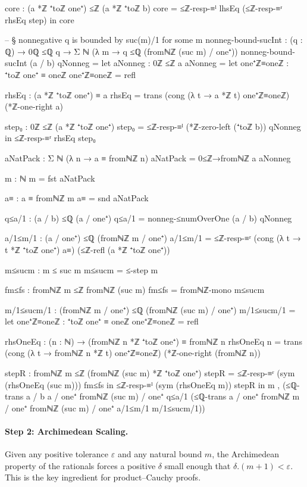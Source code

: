 \documentclass[11pt,a4paper]{book}
\def\cdot{.}%
\begin{document}
\begin{code}
    core : (a *ℤ ⁺toℤ one⁺) ≤ℤ (a *ℤ ⁺toℤ b)
    core = ≤ℤ-resp-≡ˡ lhsEq (≤ℤ-resp-≡ʳ rhsEq step)
  in
  core

-- § nonnegative q is bounded by suc(m)/1 for some m
nonneg-bound-sucInt : (q : ℚ) → 0ℚ ≤ℚ q → Σ ℕ (λ m → q ≤ℚ (fromℕℤ (suc m) / one⁺))
nonneg-bound-sucInt (a / b) qNonneg =
  let
    aNonneg : 0ℤ ≤ℤ a
    aNonneg =
      let
        one⁺ℤ≡oneℤ : ⁺toℤ one⁺ ≡ oneℤ
        one⁺ℤ≡oneℤ = refl

        rhsEq : (a *ℤ ⁺toℤ one⁺) ≡ a
        rhsEq = trans (cong (λ t → a *ℤ t) one⁺ℤ≡oneℤ) (*ℤ-one-right a)

        step₀ : 0ℤ ≤ℤ (a *ℤ ⁺toℤ one⁺)
        step₀ = ≤ℤ-resp-≡ˡ (*ℤ-zero-left (⁺toℤ b)) qNonneg
      in
      ≤ℤ-resp-≡ʳ rhsEq step₀

    aNatPack : Σ ℕ (λ n → a ≡ fromℕℤ n)
    aNatPack = 0≤ℤ→fromℕℤ a aNonneg

    m : ℕ
    m = fst aNatPack

    a≡ : a ≡ fromℕℤ m
    a≡ = snd aNatPack

    q≤a/1 : (a / b) ≤ℚ (a / one⁺)
    q≤a/1 = nonneg-≤numOverOne (a / b) qNonneg

    a/1≤m/1 : (a / one⁺) ≤ℚ (fromℕℤ m / one⁺)
    a/1≤m/1 =
      ≤ℤ-resp-≡ʳ
        (cong (λ t → t *ℤ ⁺toℤ one⁺) a≡)
        (≤ℤ-refl (a *ℤ ⁺toℤ one⁺))

    m≤sucm : m ≤ suc m
    m≤sucm = ≤-step m

    fm≤fs : fromℕℤ m ≤ℤ fromℕℤ (suc m)
    fm≤fs = fromℕℤ-mono m≤sucm

    m/1≤sucm/1 : (fromℕℤ m / one⁺) ≤ℚ (fromℕℤ (suc m) / one⁺)
    m/1≤sucm/1 =
      let
        one⁺ℤ≡oneℤ : ⁺toℤ one⁺ ≡ oneℤ
        one⁺ℤ≡oneℤ = refl

        rhsOneEq : (n : ℕ) → (fromℕℤ n *ℤ ⁺toℤ one⁺) ≡ fromℕℤ n
        rhsOneEq n = trans (cong (λ t → fromℕℤ n *ℤ t) one⁺ℤ≡oneℤ) (*ℤ-one-right (fromℕℤ n))

        stepR : fromℕℤ m ≤ℤ (fromℕℤ (suc m) *ℤ ⁺toℤ one⁺)
        stepR = ≤ℤ-resp-≡ʳ (sym (rhsOneEq (suc m))) fm≤fs
      in
      ≤ℤ-resp-≡ˡ (sym (rhsOneEq m)) stepR
  in
  m ,
    (≤ℚ-trans {a / b} {a / one⁺} {fromℕℤ (suc m) / one⁺} q≤a/1
      (≤ℚ-trans {a / one⁺} {fromℕℤ m / one⁺} {fromℕℤ (suc m) / one⁺} a/1≤m/1 m/1≤sucm/1))
\end{code}

\paragraph{Step 2: Archimedean Scaling.}
Given any positive tolerance $\varepsilon$ and any natural bound $m$,
the Archimedean property of the rationals forces a positive $\delta$
small enough that $\delta \cdot (m+1) < \varepsilon$.
This is the key ingredient for product--Cauchy proofs.
\end{document}
